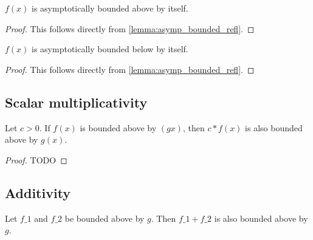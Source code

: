 \begin{lemma}
    \label{lemma:asymp_bounded_above_refl}
    \leanok
    $f(x)$ is asymptotically bounded above by itself.

\end{lemma}

\begin{proof}
    \leanok
    This follows directly from \ref{lemma:asymp_bounded_refl}.
\end{proof}

\begin{lemma}
    \label{lemma:asymp_bounded_below_refl}
    \leanok
    $f(x)$ is asymptotically bounded below by itself.

\end{lemma}

\begin{proof}
    \leanok
    This follows directly from \ref{lemma:asymp_bounded_refl}.
\end{proof}


\subsection{Scalar multiplicativity}


\begin{lemma}
    \label{lemma:asymp_bounded_above_pos_smul}
    \leanok
    Let $c > 0$. If $f(x)$ is bounded above by $(gx)$, then $c*f(x)$ is also bounded
    above by $g(x)$.
\end{lemma}

\begin{proof}
    \leanok
    TODO
\end{proof}


\subsection{Additivity}

\begin{lemma}
    \label{lemma:asymp_bounded_above_add}
    \leanok
    Let $f\_1$ and $f\_2$ be bounded above by $g$. Then $f\_1 + f\_2$ is also bounded 
    above by $g$.
\end{lemma}

